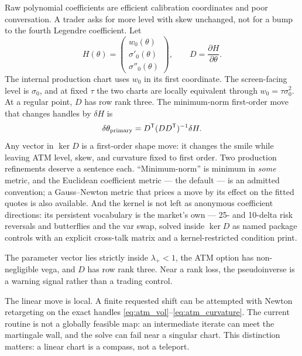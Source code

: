 \documentclass[11pt]{article}
\begin{document}
Raw polynomial coefficients are efficient calibration coordinates and poor
conversation.  A trader asks for more level with skew unchanged, not for a
bump to the fourth Legendre coefficient.  Let
\begin{equation}
H(\theta)=
\begin{pmatrix}
w_0(\theta)\\
\sigma'_0(\theta)\\
\sigma''_0(\theta)
\end{pmatrix},
\qquad
D=\frac{\partial H}{\partial\theta}.
\label{eq:handle_map}
\end{equation}
The internal production chart uses $w_0$ in its first coordinate.  The
screen-facing level is $\sigma_0$, and at fixed $\tau$ the two charts are
locally equivalent through $w_0=\tau\sigma_0^2$.  At a regular point, $D$ has
row rank three.  The minimum-norm first-order move that changes handles by
$\delta H$ is
\begin{equation}
\delta\theta_{\mathrm{primary}}
=D^{\mathsf{T}}(DD^{\mathsf{T}})^{-1}\delta H.
\label{eq:primary_move}
\end{equation}
Any vector in $\ker D$ is a first-order shape move: it changes the smile while
leaving ATM level, skew, and curvature fixed to first order.  Two production
refinements deserve a sentence each.  ``Minimum-norm'' is minimum in
\emph{some} metric, and the Euclidean coefficient metric --- the default ---
is an admitted convention; a Gauss--Newton metric that prices a move by its
effect on the fitted quotes is also available.  And the kernel is not left
as anonymous coefficient directions: its persistent vocabulary is the
market's own --- 25- and 10-delta risk reversals and butterflies and the var
swap, solved inside $\ker D$ as named package controls with an explicit
cross-talk matrix and a kernel-restricted condition print.

\begin{assumption}
\label{ass:regular}
The parameter vector lies strictly inside $\lambda_+<1$, the ATM option has
non-negligible vega, and $D$ has row rank three.  Near a rank loss, the
pseudoinverse is a warning signal rather than a trading control.
\end{assumption}

The linear move is local.  A finite requested shift can be attempted with
Newton retargeting on the exact handles
\eqref{eq:atm_vol}--\eqref{eq:atm_curvature}.  The current routine is not a
globally feasible map: an intermediate iterate can meet the martingale wall,
and the solve can fail near a singular chart.  This distinction matters: a
linear chart is a compass, not a teleport.
\end{document}
